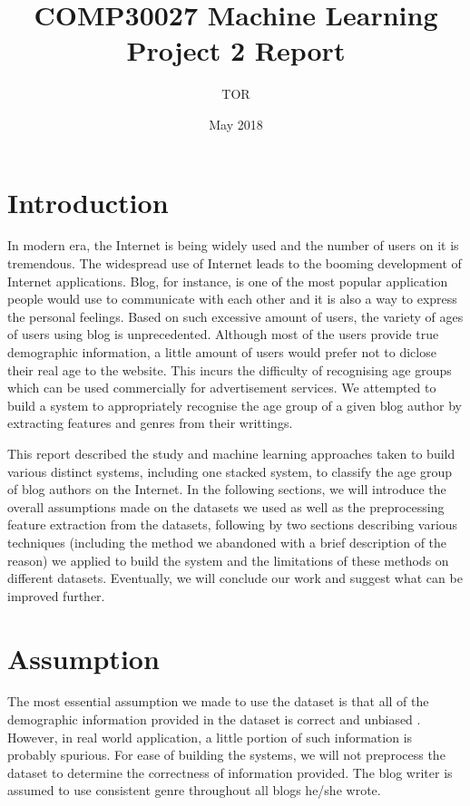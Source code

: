 \documentclass[10pt]{article}
\title{COMP30027 Machine Learning Project 2 Report}
\author{TOR}
\date{May 2018}
\begin{document}
\maketitle

\section{Introduction}
\justify

In modern era, the Internet is being widely used and the number of users on it is tremendous. The widespread use of Internet leads to the booming development of  Internet applications. Blog, for instance, is one of the most popular application people would use to communicate with each other and it is also a way to express the personal feelings. Based on such excessive amount of users, the variety of ages of users using blog is unprecedented. Although most of the users provide true demographic information, a little amount of users would prefer not to diclose their real age to the website. This incurs the difficulty of recognising age groups which can be used commercially for advertisement services. We attempted to build a system to appropriately recognise the age group of a given blog author by extracting features and genres from their writtings.

\noindent
This report described the study and machine learning approaches taken to build various distinct systems, including one stacked system, to classify the age group of blog authors on the Internet. In the following sections, we will introduce the overall assumptions made on the datasets we used as well as the preprocessing feature extraction from the datasets, following by two sections describing various techniques (including the method we abandoned with a brief description of the reason) we applied to build the system and the limitations of these methods on different datasets. Eventually, we will conclude our work and suggest what can be improved further.

\section{Assumption}
\justify

The most essential assumption we made to use the dataset is that all of the demographic information provided in the dataset is correct and unbiased \cite{dataset}. However, in real world application, a little portion of such information is probably spurious. For ease of building the systems, we will not preprocess the dataset to determine the correctness of information provided. The blog writer is assumed to use consistent genre throughout all blogs he/she wrote.
\end{document}
